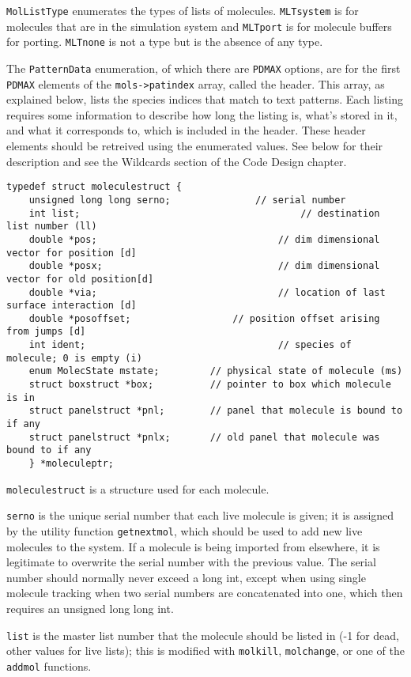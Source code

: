 \documentclass {book}
\begin{document}
\texttt{MolListType} enumerates the types of lists of molecules.  \texttt{MLTsystem} is for molecules that are in the simulation system and \texttt{MLTport} is for molecule buffers for porting.  \texttt{MLTnone} is not a type but is the absence of any type.

The \texttt{PatternData} enumeration, of which there are \texttt{PDMAX} options, are for the first \texttt{PDMAX} elements of the \texttt{mols->patindex} array, called the header.  This array, as explained below, lists the species indices that match to text patterns.  Each listing requires some information to describe how long the listing is, what's stored in it, and what it corresponds to, which is included in the header.  These header elements should be retreived using the enumerated values.  See below for their description and see the Wildcards section of the Code Design chapter.

\begin{lstlisting}
typedef struct moleculestruct {
	unsigned long long serno;				// serial number
	int list;										// destination list number (ll)
	double *pos;								// dim dimensional vector for position [d]
	double *posx;								// dim dimensional vector for old position[d]
	double *via;								// location of last surface interaction [d]
	double *posoffset;					// position offset arising from jumps [d]
	int ident;									// species of molecule; 0 is empty (i)
	enum MolecState mstate;			// physical state of molecule (ms)
	struct boxstruct *box;			// pointer to box which molecule is in
	struct panelstruct *pnl;		// panel that molecule is bound to if any
	struct panelstruct *pnlx;		// old panel that molecule was bound to if any
	} *moleculeptr;
\end{lstlisting}

\texttt{moleculestruct} is a structure used for each molecule.

\texttt{serno} is the unique serial number that each live molecule is given; it is assigned by the utility function \texttt{getnextmol}, which should be used to add new live molecules to the system.  If a molecule is being imported from elsewhere, it is legitimate to overwrite the serial number with the previous value.  The serial number should normally never exceed a long int, except when using single molecule tracking when two serial numbers are concatenated into one, which then requires an unsigned long long int.

\texttt{list} is the master list number that the molecule should be listed in (-1 for dead, other values for live lists); this is modified with \texttt{molkill}, \texttt{molchange}, or one of the \texttt{addmol} functions.
\end{document}
